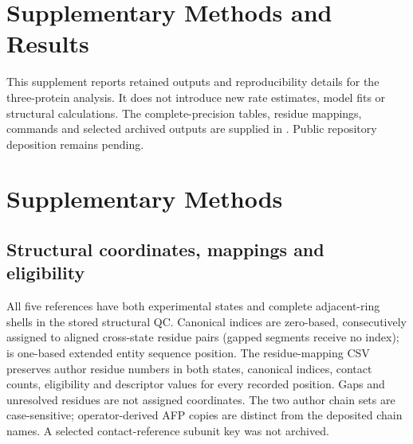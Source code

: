 \section*{Supplementary Methods and Results}
\setcounter{section}{0}
\setcounter{subsection}{0}
\setcounter{table}{0}
\setcounter{figure}{0}
\renewcommand{\thesection}{S\arabic{section}}
\renewcommand{\thetable}{S\arabic{table}}
\renewcommand{\thefigure}{S\arabic{figure}}
\renewcommand{\theHsection}{supp.\arabic{section}}
\renewcommand{\theHtable}{supp.\arabic{table}}
\renewcommand{\theHfigure}{supp.\arabic{figure}}


This supplement reports retained outputs and reproducibility details for the three-protein analysis. It does not introduce new rate estimates, model fits or structural calculations. The complete-precision tables, residue mappings, commands and selected archived outputs are supplied in . Public repository deposition remains pending.

\section{Supplementary Methods}

\subsection{Structural coordinates, mappings and eligibility}

All five references have both experimental states and complete adjacent-ring shells in the stored structural QC. Canonical indices are zero-based, consecutively assigned to aligned cross-state residue pairs (gapped segments receive no index);  is one-based extended entity sequence position. The residue-mapping CSV preserves author residue numbers in both states, canonical indices, contact counts, eligibility and descriptor values for every recorded position. Gaps and unresolved residues are not assigned coordinates. The two author chain sets are case-sensitive; operator-derived AFP copies are distinct from the deposited chain names. A selected contact-reference subunit key was not archived.

